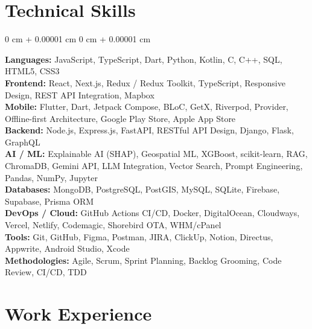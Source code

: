 \documentclass[10pt, a4paper]{article}
\newenvironment{onecolentry}{
    \begin{adjustwidth}{
        0 cm + 0.00001 cm
    }{
        0 cm + 0.00001 cm
    }
}{
    \end{adjustwidth}
}
\begin{document}
    \section{Technical Skills}

    \begin{onecolentry}
        \textbf{Languages:} JavaScript, TypeScript, Dart, Python, Kotlin, C, C++, SQL, HTML5, CSS3\\
        \textbf{Frontend:} React, Next.js, Redux / Redux Toolkit, TypeScript, Responsive Design, REST API Integration, Mapbox\\
        \textbf{Mobile:} Flutter, Dart, Jetpack Compose, BLoC, GetX, Riverpod, Provider, Offline-first Architecture, Google Play Store, Apple App Store\\
        \textbf{Backend:} Node.js, Express.js, FastAPI, RESTful API Design, Django, Flask, GraphQL\\
        \textbf{AI / ML:} Explainable AI (SHAP), Geospatial ML, XGBoost, scikit-learn, RAG, ChromaDB, Gemini API, LLM Integration, Vector Search, Prompt Engineering, Pandas, NumPy, Jupyter\\
        \textbf{Databases:} MongoDB, PostgreSQL, PostGIS, MySQL, SQLite, Firebase, Supabase, Prisma ORM\\
        \textbf{DevOps / Cloud:} GitHub Actions CI/CD, Docker, DigitalOcean, Cloudways, Vercel, Netlify, Codemagic, Shorebird OTA, WHM/cPanel\\
        \textbf{Tools:} Git, GitHub, Figma, Postman, JIRA, ClickUp, Notion, Directus, Appwrite, Android Studio, Xcode\\
        \textbf{Methodologies:} Agile, Scrum, Sprint Planning, Backlog Grooming, Code Review, CI/CD, TDD
    \end{onecolentry}

    \section{Work Experience}
\end{document}
